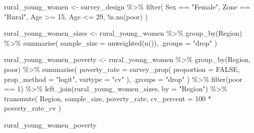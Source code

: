 \documentclass[
  spanish,
  11pt,
  letterpaper,
  oneside,
  open=any]{scrbook}
\newenvironment{Shaded}{\begin{snugshade}}{\end{snugshade}}
\newcommand{\AttributeTok}[1]{\textcolor[rgb]{0.40,0.45,0.13}{#1}}
\newcommand{\ConstantTok}[1]{\textcolor[rgb]{0.56,0.35,0.01}{#1}}
\newcommand{\DecValTok}[1]{\textcolor[rgb]{0.68,0.00,0.00}{#1}}
\newcommand{\FunctionTok}[1]{\textcolor[rgb]{0.28,0.35,0.67}{#1}}
\newcommand{\NormalTok}[1]{\textcolor[rgb]{0.00,0.23,0.31}{#1}}
\newcommand{\OtherTok}[1]{\textcolor[rgb]{0.00,0.23,0.31}{#1}}
\newcommand{\SpecialCharTok}[1]{\textcolor[rgb]{0.37,0.37,0.37}{#1}}
\newcommand{\StringTok}[1]{\textcolor[rgb]{0.13,0.47,0.30}{#1}}
\begin{document}
\begin{Shaded}
\begin{Highlighting}[]
\NormalTok{rural\_young\_women }\OtherTok{\textless{}{-}}\NormalTok{ survey\_design }\SpecialCharTok{\%\textgreater{}\%}
  \FunctionTok{filter}\NormalTok{(}
\NormalTok{    Sex }\SpecialCharTok{==} \StringTok{"Female"}\NormalTok{,}
\NormalTok{    Zone }\SpecialCharTok{==} \StringTok{"Rural"}\NormalTok{,}
\NormalTok{    Age }\SpecialCharTok{\textgreater{}=} \DecValTok{15}\NormalTok{,}
\NormalTok{    Age }\SpecialCharTok{\textless{}=} \DecValTok{29}\NormalTok{,}
    \SpecialCharTok{!}\FunctionTok{is.na}\NormalTok{(poor)}
\NormalTok{  )}

\NormalTok{rural\_young\_women\_sizes }\OtherTok{\textless{}{-}}\NormalTok{ rural\_young\_women }\SpecialCharTok{\%\textgreater{}\%}
  \FunctionTok{group\_by}\NormalTok{(Region) }\SpecialCharTok{\%\textgreater{}\%}
  \FunctionTok{summarise}\NormalTok{(}
    \AttributeTok{sample\_size =} \FunctionTok{unweighted}\NormalTok{(}\FunctionTok{n}\NormalTok{()),}
    \AttributeTok{.groups =} \StringTok{"drop"}
\NormalTok{  )}

\NormalTok{rural\_young\_women\_poverty }\OtherTok{\textless{}{-}}\NormalTok{ rural\_young\_women }\SpecialCharTok{\%\textgreater{}\%}
  \FunctionTok{group\_by}\NormalTok{(Region, poor) }\SpecialCharTok{\%\textgreater{}\%}
  \FunctionTok{summarise}\NormalTok{(}
    \AttributeTok{poverty\_rate =} \FunctionTok{survey\_prop}\NormalTok{(}
      \AttributeTok{proportion =} \ConstantTok{FALSE}\NormalTok{,}
      \AttributeTok{prop\_method =} \StringTok{"logit"}\NormalTok{,}
      \AttributeTok{vartype =} \StringTok{"cv"}
\NormalTok{    ),}
    \AttributeTok{.groups =} \StringTok{"drop"}
\NormalTok{  ) }\SpecialCharTok{\%\textgreater{}\%}
  \FunctionTok{filter}\NormalTok{(poor }\SpecialCharTok{==} \DecValTok{1}\NormalTok{) }\SpecialCharTok{\%\textgreater{}\%}
  \FunctionTok{left\_join}\NormalTok{(rural\_young\_women\_sizes, }\AttributeTok{by =} \StringTok{"Region"}\NormalTok{) }\SpecialCharTok{\%\textgreater{}\%}
  \FunctionTok{transmute}\NormalTok{(}
\NormalTok{    Region,}
\NormalTok{    sample\_size,}
\NormalTok{    poverty\_rate,}
    \AttributeTok{cv\_percent =} \DecValTok{100} \SpecialCharTok{*}\NormalTok{ poverty\_rate\_cv}
\NormalTok{  )}

\NormalTok{rural\_young\_women\_poverty}
\end{Highlighting}
\end{Shaded}
\end{document}
